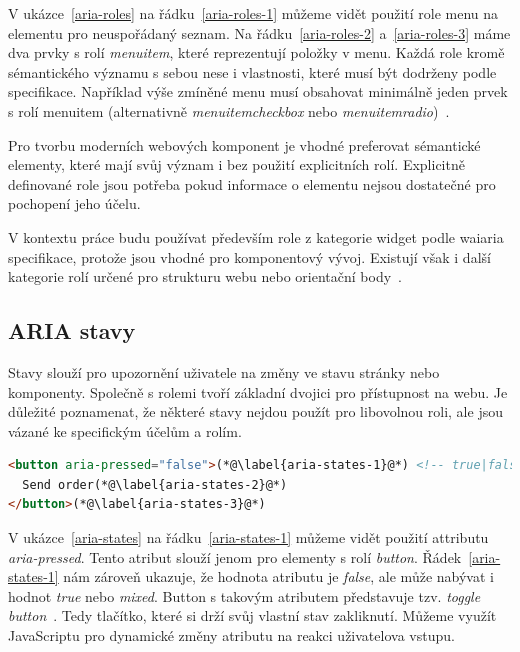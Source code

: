 V ukázce~\ref{aria-roles} na řádku~\ref{aria-roles-1} můžeme vidět použití role menu na elementu pro neuspořádaný seznam.
Na řádku~\ref{aria-roles-2} a~\ref{aria-roles-3} máme dva prvky s rolí \textit{menuitem}, které reprezentují položky v menu.
Každá role kromě sémantického významu s sebou nese i vlastnosti, které musí být dodrženy podle specifikace.
Například výše zmíněné menu musí obsahovat minimálně jeden prvek s rolí menuitem (alternativně \textit{menuitemcheckbox} nebo \textit{menuitemradio})~\cite{wai-required-owned-elements,wai-standard-guidelines-required-owned-elements}.

Pro tvorbu moderních webových komponent je vhodné preferovat sémantické elementy, které mají svůj význam i bez použití explicitních rolí.
Explicitně definované role jsou potřeba pokud informace o elementu nejsou dostatečné pro pochopení jeho účelu.

V kontextu práce budu používat především role z kategorie widget podle \gls{waiaria} specifikace, protože jsou vhodné pro komponentový vývoj.
Existují však i další kategorie rolí určené pro strukturu webu nebo orientační body~\cite{wai-catorization-of-roles}.

\subsection{ARIA stavy}

Stavy slouží pro upozornění uživatele na změny ve stavu stránky nebo komponenty.
Společně s rolemi tvoří základní dvojici pro přístupnost na webu.
Je důležité poznamenat, že některé stavy nejdou použít pro libovolnou roli, ale jsou vázané ke specifickým účelům a rolím.

\begin{lstlisting}[caption={Aria stavové atributy}, label={aria-states}, language=html]
<button aria-pressed="false">(*@\label{aria-states-1}@*) <!-- true|false|mixed -->
  Send order(*@\label{aria-states-2}@*)
</button>(*@\label{aria-states-3}@*)
\end{lstlisting}

V ukázce~\ref{aria-states} na řádku~\ref{aria-states-1} můžeme vidět použití attributu \textit{aria-pressed}.
Tento atribut slouží jenom pro elementy s rolí \textit{button}.
Řádek~\ref{aria-states-1} nám zároveň ukazuje, že hodnota atributu je \textit{false}, ale může nabývat i hodnot \textit{true} nebo \textit{mixed}.
Button s takovým atributem představuje tzv. \textit{toggle button}~\cite{mdn-aria-pressed}. Tedy tlačítko, které si drží svůj vlastní stav zakliknutí.
Můžeme využít JavaScriptu pro dynamické změny atributu na reakci uživatelova vstupu.

